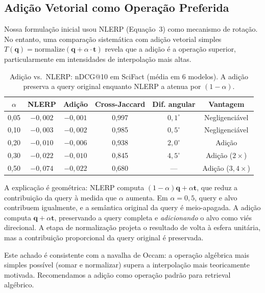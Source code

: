 \documentclass{article}
\begin{document}
\subsection{Adição Vetorial como Operação Preferida}
\label{sec:addition}

Nossa formulação inicial usou NLERP (Equação~3) como mecanismo de rotação. No entanto, uma comparação sistemática com adição vetorial simples $T(\mathbf{q}) = \text{normalize}(\mathbf{q} + \alpha \cdot \mathbf{t})$ revela que a adição é a operação superior, particularmente em intensidades de interpolação mais altas.

\begin{table}[ht]
\centering
\caption{Adição vs.\ NLERP: nDCG@10 em SciFact (média em 6 modelos). A adição preserva a query original enquanto NLERP a atenua por $(1-\alpha)$.}
\label{tab:addition}
\small
\begin{tabular}{cccccc}
\toprule
$\alpha$ & NLERP & Adição & Cross-Jaccard & Dif. angular & Vantagem \\
\midrule
0,05 & $-0{,}002$ & $-0{,}001$ & 0,997 & $0{,}1^{\circ}$ & Negligenciável \\
0,10 & $-0{,}003$ & $-0{,}002$ & 0,985 & $0{,}5^{\circ}$ & Negligenciável \\
0,20 & $-0{,}010$ & $-0{,}006$ & 0,938 & $2{,}0^{\circ}$ & Adição \\
0,30 & $-0{,}022$ & $-0{,}010$ & 0,845 & $4{,}5^{\circ}$ & Adição ($2\times$) \\
0,50 & $-0{,}074$ & $-0{,}022$ & 0,680 & --- & Adição ($3{,}4\times$) \\
\bottomrule
\end{tabular}
\end{table}

A explicação é geométrica: NLERP computa $(1-\alpha)\mathbf{q} + \alpha\mathbf{t}$, que reduz a contribuição da query à medida que $\alpha$ aumenta. Em $\alpha = 0{,}5$, query e alvo contribuem igualmente, e a semântica original da query é meio-apagada. A adição computa $\mathbf{q} + \alpha \mathbf{t}$, preservando a query completa e \emph{adicionando} o alvo como viés direcional. A etapa de normalização projeta o resultado de volta à esfera unitária, mas a contribuição proporcional da query original é preservada.

Este achado é consistente com a navalha de Occam: a operação algébrica mais simples possível (somar e normalizar) supera a interpolação mais teoricamente motivada. Recomendamos a adição como operação padrão para retrieval algébrico.
\end{document}
